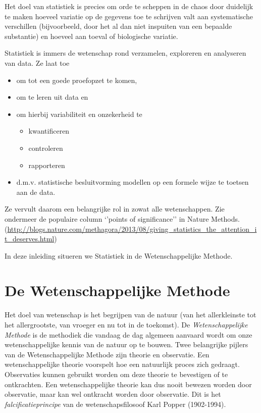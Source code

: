 \documentclass[
  12pt,dutch,coursenotes]{book}
\providecommand{\tightlist}{%
  \setlength{\itemsep}{0pt}\setlength{\parskip}{0pt}}
\theoremstyle{definition}
\theoremstyle{definition}
\theoremstyle{definition}
\theoremstyle{definition}
\theoremstyle{remark}
\begin{document}
Het doel van statistiek is precies om orde te scheppen in de chaos door duidelijk te maken hoeveel variatie op de gegevens toe te schrijven valt aan systematische verschillen (bijvoorbeeld, door het al dan niet inspuiten van een bepaalde substantie) en hoeveel aan toeval of biologische variatie.

Statistiek is immers de wetenschap rond verzamelen, exploreren en analyseren van data. Ze laat toe

\begin{itemize}
\tightlist
\item
  om tot een goede proefopzet te komen,
\item
  om te leren uit data en
\item
  om hierbij variabiliteit en onzekerheid te

  \begin{itemize}
  \tightlist
  \item
    kwantificeren
  \item
    controleren
  \item
    rapporteren
  \end{itemize}
\item
  d.m.v. statistische besluitvorming modellen op een formele wijze te toetsen aan de data.
\end{itemize}

Ze vervult daarom een belangrijke rol in zowat alle wetenschappen. Zie ondermeer de populaire column `'points of significance'' in Nature Methods. (\url{http://blogs.nature.com/methagora/2013/08/giving_statistics_the_attention_it_deserves.html})

In deze inleiding situeren we Statistiek in de Wetenschappelijke Methode.

\hypertarget{sec:wetMeth}{%
\section{De Wetenschappelijke Methode}\label{sec:wetMeth}}

Het doel van wetenschap is het begrijpen van de natuur (van het allerkleinste tot het allergrootste, van vroeger en nu tot in de toekomst). De \emph{Wetenschappelijke Methode} is de methodiek die vandaag de dag algemeen aanvaard wordt om onze wetenschappelijke kennis van de natuur op te bouwen. Twee belangrijke pijlers van de Wetenschappelijke Methode zijn theorie en observatie. Een wetenschappelijke theorie voorspelt hoe een natuurlijk proces zich gedraagt. Observaties kunnen gebruikt worden om deze theorie te bevestigen of te ontkrachten. Een wetenschappelijke theorie kan dus nooit bewezen worden door observatie, maar kan wel ontkracht worden door observatie. Dit is het \emph{falcificatieprincipe} van de wetenschapsfilosoof Karl Popper (1902-1994).
\end{document}
